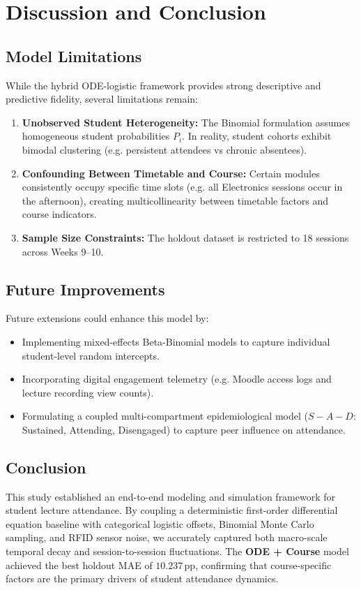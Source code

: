 \documentclass{article}
\begin{document}
\section{Discussion and Conclusion}

\subsection{Model Limitations}
While the hybrid ODE-logistic framework provides strong descriptive and predictive fidelity, several limitations remain:
\begin{enumerate}
    \item \textbf{Unobserved Student Heterogeneity:} The Binomial formulation assumes homogeneous student probabilities $P_i$. In reality, student cohorts exhibit bimodal clustering (e.g. persistent attendees vs chronic absentees).
    \item \textbf{Confounding Between Timetable and Course:} Certain modules consistently occupy specific time slots (e.g. all Electronics sessions occur in the afternoon), creating multicollinearity between timetable factors and course indicators.
    \item \textbf{Sample Size Constraints:} The holdout dataset is restricted to 18 sessions across Weeks 9--10.
\end{enumerate}

\subsection{Future Improvements}
Future extensions could enhance this model by:
\begin{itemize}
    \item Implementing mixed-effects Beta-Binomial models to capture individual student-level random intercepts.
    \item Incorporating digital engagement telemetry (e.g. Moodle access logs and lecture recording view counts).
    \item Formulating a coupled multi-compartment epidemiological model ($S-A-D$: Sustained, Attending, Disengaged) to capture peer influence on attendance.
\end{itemize}

\subsection{Conclusion}
This study established an end-to-end modeling and simulation framework for student lecture attendance. By coupling a deterministic first-order differential equation baseline with categorical logistic offsets, Binomial Monte Carlo sampling, and RFID sensor noise, we accurately captured both macro-scale temporal decay and session-to-session fluctuations. The \textbf{ODE + Course} model achieved the best holdout MAE of $10.237$\,pp, confirming that course-specific factors are the primary drivers of student attendance dynamics.
\end{document}
